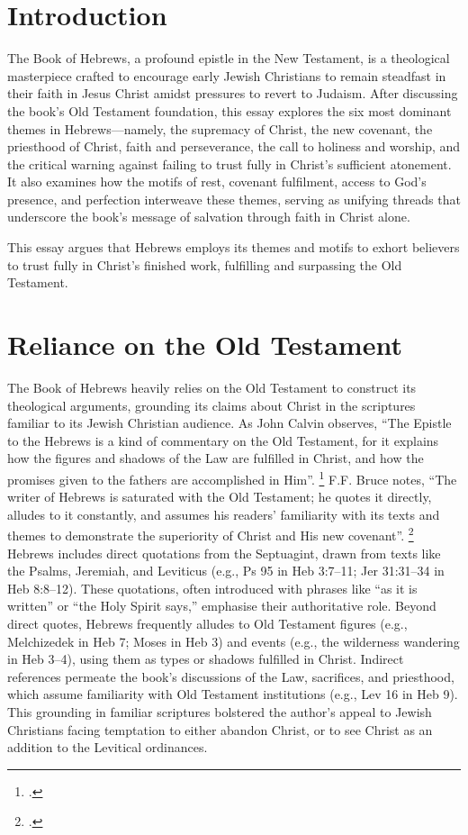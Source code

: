 \documentclass[12pt]{article}
\begin{document}
\section{Introduction}
The Book of Hebrews, a profound epistle in the New Testament, is a theological
masterpiece crafted to encourage early Jewish Christians to remain steadfast in
their faith in Jesus Christ amidst pressures to revert to Judaism. After
discussing the book’s Old Testament foundation, this essay explores the six
most dominant themes in Hebrews---namely, the supremacy of Christ, the new
covenant, the priesthood of Christ, faith and perseverance, the call to
holiness and worship, and the critical warning against failing to trust fully
in Christ’s sufficient atonement. It also examines how the motifs of rest,
covenant fulfilment, access to God’s presence, and perfection interweave these
themes, serving as unifying threads that underscore the book’s message of
salvation through faith in Christ alone.

This essay argues that Hebrews employs its themes and motifs to exhort believers
to trust fully in Christ’s finished work, fulfilling and surpassing the Old
Testament.

\section{Reliance on the Old Testament}
The Book of Hebrews heavily relies on the Old Testament to construct its
theological arguments, grounding its claims about Christ in the scriptures
familiar to its Jewish Christian audience. As John Calvin observes,
``The Epistle to the Hebrews is a kind of commentary on the Old Testament,
for it explains how the figures and shadows of the Law are fulfilled in Christ,
and how the promises given to the fathers are accomplished in Him''.
\footcite[7]{Calvin1853}
F.F. Bruce notes, ``The writer of Hebrews is saturated with the
Old Testament; he quotes it directly, alludes to it constantly, and assumes his
readers’ familiarity with its texts and themes to demonstrate the superiority
of Christ and His new covenant''. \footcite[14]{Bruce1964}
Hebrews includes direct quotations from the Septuagint, drawn from texts like
the Psalms, Jeremiah, and Leviticus (e.g., Ps 95 in Heb 3:7--11; Jer 31:31--34
in Heb 8:8--12).
These quotations, often introduced with phrases like ``as it is written'' or
``the Holy Spirit says,'' emphasise their authoritative role.
Beyond direct quotes, Hebrews frequently alludes to Old Testament figures (e.g.,
Melchizedek in Heb 7; Moses in Heb 3) and events (e.g., the wilderness wandering
in Heb 3--4), using them as types or shadows fulfilled in Christ.
Indirect references permeate the book’s discussions of the Law, sacrifices, and
priesthood, which assume familiarity with Old Testament institutions (e.g., Lev
16 in Heb 9).
This grounding in familiar scriptures bolstered the author’s appeal to Jewish
Christians facing temptation to either abandon Christ, or to see Christ as an
addition to the Levitical ordinances.
\end{document}
